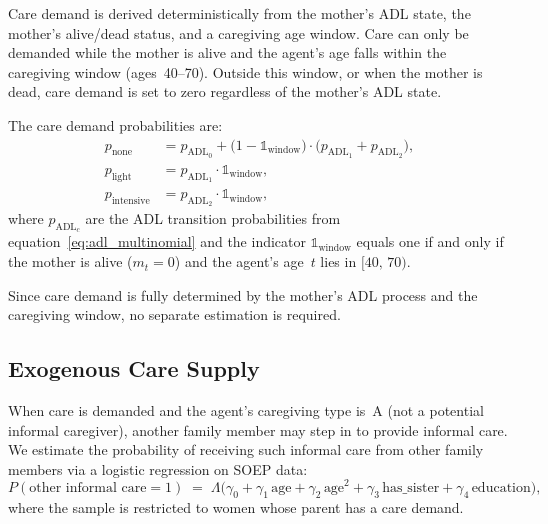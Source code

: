 Care demand is derived deterministically from the mother's ADL state, the
mother's alive/dead status, and a caregiving age window.  Care can only be
demanded while the mother is alive and the agent's age falls within the
caregiving window (ages~40--70).  Outside this window, or when the mother is
dead, care demand is set to zero regardless of the mother's ADL state.

The care demand probabilities are:
\begin{align}
  p_{\text{none}} &= p_{\text{ADL}_0}
    + \bigl(1 - \mathbb{1}_{\text{window}}\bigr)
    \cdot \bigl(p_{\text{ADL}_1} + p_{\text{ADL}_2}\bigr),
  \label{eq:care_demand_none} \\[2pt]
  p_{\text{light}} &= p_{\text{ADL}_1}
    \cdot \mathbb{1}_{\text{window}},
  \label{eq:care_demand_light} \\[2pt]
  p_{\text{intensive}} &= p_{\text{ADL}_2}
    \cdot \mathbb{1}_{\text{window}},
  \label{eq:care_demand_intensive}
\end{align}
where $p_{\text{ADL}_c}$ are the ADL transition probabilities from
equation~\eqref{eq:adl_multinomial} and the indicator
$\mathbb{1}_{\text{window}}$ equals one if and only if the mother is alive
($m_t = 0$) and the agent's age~$t$ lies in $[40,\,70)$.

Since care demand is fully determined by the mother's ADL process and the
caregiving window, no separate estimation is required.


\subsection{Exogenous Care Supply}
\label{sec:exog_care_supply}

When care is demanded and the agent's caregiving type is~A (not a potential
informal caregiver), another family member may step in to provide informal
care.  We estimate the probability of receiving such informal care from
other family members via a logistic regression on SOEP data:
\begin{equation}
  P(\text{other informal care} = 1)
  \;=\; \Lambda\!\bigl(\gamma_0 + \gamma_1\,\text{age}
  + \gamma_2\,\text{age}^2
  + \gamma_3\,\text{has\_sister}
  + \gamma_4\,\text{education}\bigr),
  \label{eq:exog_care_supply}
\end{equation}
where the sample is restricted to women whose parent has a care demand.

